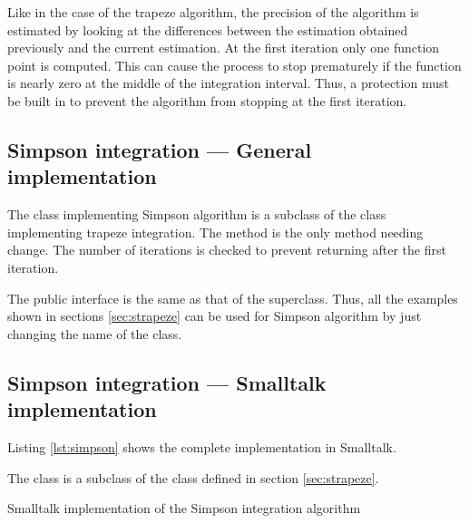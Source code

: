 Like in the case of the trapeze algorithm, the precision of the
algorithm is estimated by looking at the differences between the
estimation obtained previously and the current estimation. At the
first iteration only one function point is computed. This can
cause the process to stop prematurely if the function is nearly
zero at the middle of the integration interval. Thus, a protection
must be built in to prevent the algorithm from stopping at the
first iteration.

\subsection{Simpson integration --- General implementation}
The class implementing Simpson algorithm is a subclass of the
class implementing trapeze integration. The method  is the only method needing change.
The number of iterations is checked to prevent returning after the first
iteration.

The public interface is the same as that of the superclass.
Thus, all the examples shown in sections \ref{sec:strapeze} can be used for Simpson
algorithm by just changing the name of the class.

\subsection{Simpson integration --- Smalltalk implementation}
\label{sec:sSimpson} Listing \ref{lst:simpson} shows the complete
implementation in Smalltalk.

The class  is a subclass of the class
 defined in section \ref{sec:strapeze}.

\begin{listing} Smalltalk implementation of the Simpson integration algorithm \label{ls:simpson}

\end{listing}

